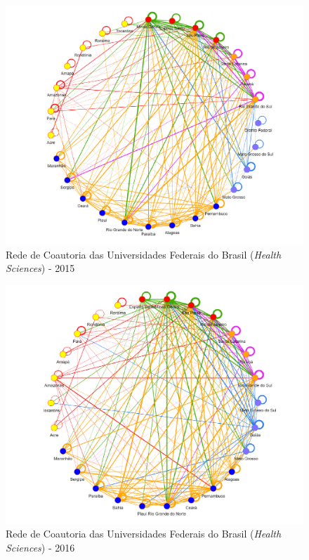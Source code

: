 \begin{figure}[H]
	\centering
	\includegraphics[scale=0.6]{Imagens/rede-2015.pdf}
	\caption{Rede de Coautoria das Universidades Federais do Brasil (\textit{Health Sciences}) - 2015}
	\label{Rede de Coautoria - UF BR 2015}
\end{figure}

\begin{figure}[H]
	\centering
	\includegraphics[scale=0.6]{Imagens/rede-2016.pdf}
	\caption{Rede de Coautoria das Universidades Federais do Brasil (\textit{Health Sciences}) - 2016}
	\label{Rede de Coautoria - UF BR 2016}
\end{figure}

